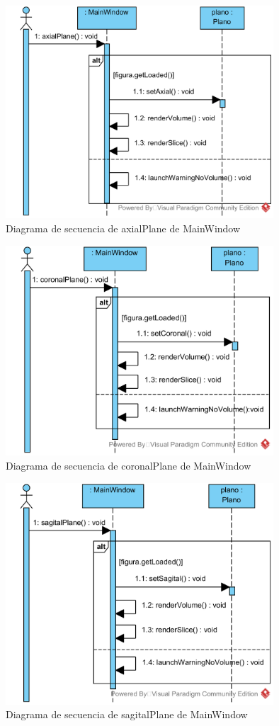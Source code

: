\begin{figure}[H]
	\centering
	\includegraphics[width=10cm]{imagenes/diagramas/secuencia/MainWindow_AxialPlane}
	\caption{Diagrama de secuencia de axialPlane de MainWindow}
	\label{fig:diagrama_secuencia_mainWindow_axialPlane}
\end{figure}

\begin{figure}[H]
	\centering
	\includegraphics[width=10cm]{imagenes/diagramas/secuencia/MainWindow_CoronalPlane}
	\caption{Diagrama de secuencia de coronalPlane de MainWindow}
	\label{fig:diagrama_secuencia_mainWindow_coronalPlane}
\end{figure}

\begin{figure}[H]
	\centering
	\includegraphics[width=10cm]{imagenes/diagramas/secuencia/MainWindow_SagitalPlane}
	\caption{Diagrama de secuencia de sagitalPlane de MainWindow}
	\label{fig:diagrama_secuencia_mainWindow_sagitalPlane}
\end{figure}

